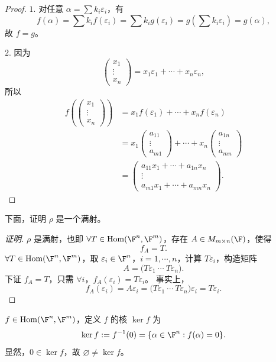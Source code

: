 \begin{proof}
	$1.$ 对任意 $\alpha=\sum k_i\varepsilon_i$，有
	\[
	f(\alpha)=\sum k_i f(\varepsilon_i)
	=\sum k_i g(\varepsilon_i)
	=g\left(\sum k_i\varepsilon_i\right)=g(\alpha),
	\]
	故 $f=g$。
	
	$2.$ 因为
	\[
	\begin{pmatrix}x_1\\\vdots\\x_n\end{pmatrix}
	=x_1\varepsilon_1+\cdots+x_n\varepsilon_n,
	\]
	所以
	\[
	\begin{aligned}
		f\left(\begin{pmatrix}x_1\\\vdots\\x_n\end{pmatrix}\right)
		&=x_1f(\varepsilon_1)+\cdots+x_nf(\varepsilon_n)\\
		&=x_1\begin{pmatrix}a_{11}\\\vdots\\a_{m1}\end{pmatrix}
		+\cdots+
		x_n\begin{pmatrix}a_{1n}\\\vdots\\a_{mn}\end{pmatrix}\\
		&=\begin{pmatrix}
			a_{11}x_1+\cdots+a_{1n}x_n\\
			\vdots\\
			a_{m1}x_1+\cdots+a_{mn}x_n
		\end{pmatrix}.
	\end{aligned}
	\]
\end{proof}

下面，证明 $\rho$ 是一个满射。
\begin{proof}[证明]
	$\rho$ 是满射，也即 $\forall T\in\operatorname{Hom}(\F^n,\F^m)$，存在 $A\in M_{m\times n}(\F)$，使得
	\[
	f_A=T.
	\]
	$\forall T\in\operatorname{Hom}(\F^n,\F^m)$，取 $\varepsilon_i\in\F^n$，$i=1,\cdots,n$，计算 $T\varepsilon_i$，构造矩阵
	\[
	A=\bigl(T\varepsilon_1\ \cdots\ T\varepsilon_n\bigr).
	\]
	下证 $f_A=T$，只需 $\forall i$，$f_A(\varepsilon_i)=T\varepsilon_i$。
	事实上，
	\[
	f_A(\varepsilon_i)=A\varepsilon_i
	=\bigl(T\varepsilon_1\ \cdots\ T\varepsilon_n\bigr)\varepsilon_i
	=T\varepsilon_i.
	\]
\end{proof}

\begin{definition}\label{p1:concept:c3-l209}
	$f\in\operatorname{Hom}(\F^n,\F^m)$，定义 $f$ 的核 $\ker f$ 为
	\[
	\ker f:=f^{-1}(0)=\{\alpha\in\F^n:f(\alpha)=0\}.
	\]
	显然，$0\in\ker f$，故 $\varnothing\neq\ker f$。
\end{definition}


